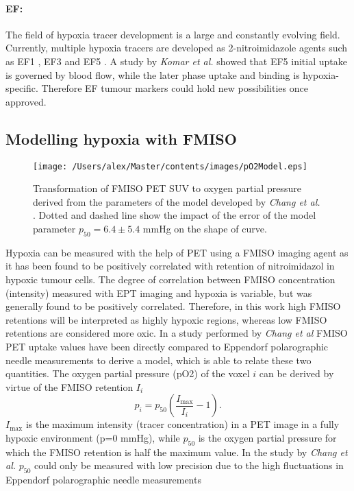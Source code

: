 \paragraph{EF: }The field of hypoxia tracer development is a large and constantly evolving field. Currently, multiple hypoxia tracers are developed as 2-nitroimidazole agents such as EF1 \cite{pmid10688119}, EF3 \cite{pmid17334763} and EF5 \cite{pmid12552344}. A study by \textit{Komar et al.} \cite{pmid18997048} showed that EF5 initial uptake is governed by blood flow, while the later phase uptake and binding is hypoxia-specific. Therefore EF tumour markers could hold new possibilities once approved.
\subsection{Modelling hypoxia with FMISO}
\begin{figure}[htb]
\centering
\texttt{[image: /Users/alex/Master/contents/images/pO2Model.eps]}
\vspace{1cm}
\caption{Transformation of FMISO PET SUV to oxygen partial pressure derived from the parameters of the model developed by \textit{Chang et al.}\cite{pmid19994538} . Dotted and dashed line show the impact of the error of the model parameter $p_{50} = 6.4 \pm 5.4$ mmHg on the shape of curve.}
\label{fig:pO2Model}
\end{figure}
Hypoxia can be measured with the help of PET using a FMISO imaging agent as it has been found to be positively correlated with retention of nitroimidazol in hypoxic tumour cells. The degree of correlation between FMISO concentration (intensity) measured with EPT imaging and hypoxia is variable, but was generally found to be positively correlated. Therefore, in this work high FMISO retentions will be interpreted as highly hypoxic regions, whereas low FMISO retentions are considered more oxic. In a study performed by \textit{Chang et al} \cite{pmid19994538} FMISO PET uptake values have been directly compared to Eppendorf polarographic needle measurements to derive a model, which is able to relate these two quantities. The oxygen partial pressure (pO2) of the voxel $i$ can be derived by virtue of the FMISO retention $I_i$
\begin{equation}\label{eq:changmodel}
p_i = p_\mathrm{50}\left(\frac{I_\mathrm{max}}{I_i}-1\right).
\end{equation}
$I_\mathrm{max}$ is the maximum intensity (tracer concentration) in a PET image in a fully hypoxic environment (p=0 mmHg), while $p_\mathrm{50}$ is the oxygen partial pressure for which the FMISO retention is half the maximum value. In the study by \textit{Chang et al.} \cite{pmid19994538} $p_\mathrm{50}$ could only be measured with low precision due to the high fluctuations in Eppendorf polarographic needle measurements
